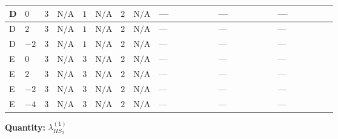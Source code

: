 \documentclass[8pt]{article}
\begin{document}
\begin{landscape}
\begin{longtable}{@{}llcccccc >{\raggedright\arraybackslash}p{0.21\linewidth} >{\raggedright\arraybackslash}p{0.21\linewidth} >{\raggedright\arraybackslash}p{0.21\linewidth}@{}}
\midrule
D & $0$ & $3$ & $\text{N/A}$ & $1$ & $\text{N/A}$ & $2$ & $\text{N/A}$ & --- & --- & --- \\
\midrule
D & $2$ & $3$ & $\text{N/A}$ & $1$ & $\text{N/A}$ & $2$ & $\text{N/A}$ & --- & --- & --- \\
\midrule
D & $-2$ & $3$ & $\text{N/A}$ & $1$ & $\text{N/A}$ & $2$ & $\text{N/A}$ & --- & --- & --- \\
\midrule
E & $0$ & $3$ & $\text{N/A}$ & $3$ & $\text{N/A}$ & $2$ & $\text{N/A}$ & --- & --- & --- \\
\midrule
E & $2$ & $3$ & $\text{N/A}$ & $3$ & $\text{N/A}$ & $2$ & $\text{N/A}$ & --- & --- & --- \\
\midrule
E & $-2$ & $3$ & $\text{N/A}$ & $3$ & $\text{N/A}$ & $2$ & $\text{N/A}$ & --- & --- & --- \\
\midrule
E & $-4$ & $3$ & $\text{N/A}$ & $3$ & $\text{N/A}$ & $2$ & $\text{N/A}$ & --- & --- & --- \\
\midrule
\bottomrule
\end{longtable}
\clearpage
\noindent\textbf{Quantity: }$\lambda_{HS_2}^{(1)}$\par\smallskip

\end{landscape}
\end{document}
